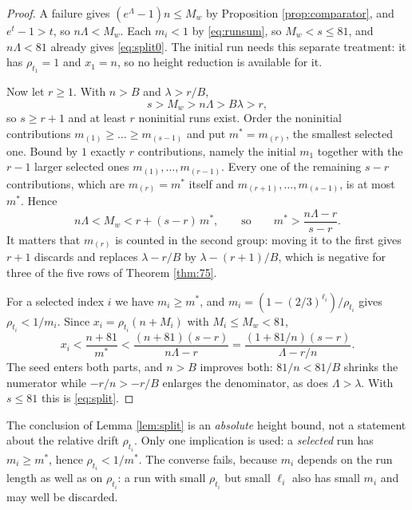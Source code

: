 \documentclass[11pt,a4paper]{article}
\theoremstyle{plain}\newtheorem{theorem}{Theorem}\newtheorem{proposition}[theorem]{Proposition}
\theoremstyle{definition}\newtheorem{example}[theorem]{Example}
\theoremstyle{remark}\newtheorem{remark}[theorem]{Remark}
\begin{document}
\begin{proof}
A failure gives $(e^\Lambda-1)n\le M_w$ by Proposition \ref{prop:comparator}, and $e^t-1>t$,
so $n\Lambda<M_w$. Each $m_i<1$ by \eqref{eq:runsum}, so $M_w<s\le81$, and
$n\Lambda<81$ already gives \eqref{eq:split0}. The initial run needs this separate treatment:
it has $\rho_{t_1}=1$ and $x_1=n$, so no height reduction is available for it.

Now let $r\ge1$. With $n>B$ and $\lambda>r/B$,
\[
 s>M_w>n\Lambda>B\lambda>r,
\]
so $s\ge r+1$ and at least $r$ noninitial runs exist. Order the noninitial contributions
$m_{(1)}\ge\dots\ge m_{(s-1)}$ and put $m^*=m_{(r)}$, the smallest selected one. Bound by $1$
exactly $r$ contributions, namely the initial $m_1$ together with the $r-1$ larger selected ones
$m_{(1)},\dots,m_{(r-1)}$. Every one of the remaining $s-r$ contributions, which are
$m_{(r)}=m^*$ itself and $m_{(r+1)},\dots,m_{(s-1)}$, is at most $m^*$. Hence
\[
 n\Lambda<M_w<r+(s-r)\,m^*,\qquad\text{so}\qquad m^*>\frac{n\Lambda-r}{s-r}.
\]
It matters that $m_{(r)}$ is counted in the second group: moving it to the first gives $r+1$
discards and replaces $\lambda-r/B$ by $\lambda-(r+1)/B$, which is negative for three of the
five rows of Theorem \ref{thm:75}.

For a selected index $i$ we have $m_i\ge m^*$, and $m_i=(1-(2/3)^{\ell_i})/\rho_{t_i}$ gives
$\rho_{t_i}<1/m_i$. Since $x_i=\rho_{t_i}(n+M_i)$ with $M_i\le M_w<81$,
\[
 x_i<\frac{n+81}{m^*}<\frac{(n+81)(s-r)}{n\Lambda-r}
    =\frac{(1+81/n)(s-r)}{\Lambda-r/n}.
\]
The seed enters both parts, and $n>B$ improves both: $81/n<81/B$ shrinks the numerator while
$-r/n>-r/B$ enlarges the denominator, as does $\Lambda>\lambda$. With $s\le81$ this is
\eqref{eq:split}.
\end{proof}

The conclusion of Lemma \ref{lem:split} is an \emph{absolute} height bound, not a statement
about the relative drift $\rho_{t_i}$. Only one implication is used: a \emph{selected} run has
$m_i\ge m^*$, hence $\rho_{t_i}<1/m^*$. The converse fails, because $m_i$ depends on the run
length as well as on $\rho_{t_i}$: a run with small $\rho_{t_i}$ but small $\ell_i$ also has
small $m_i$ and may well be discarded.
\end{document}
